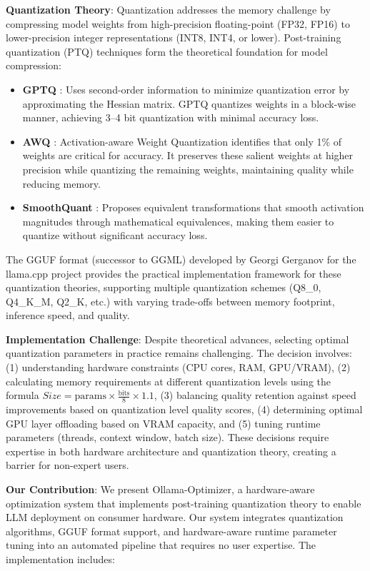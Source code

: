 \documentclass[journal]{IEEEtran}
\begin{document}
\textbf{Quantization Theory}: Quantization addresses the memory challenge by compressing model weights from high-precision floating-point (FP32, FP16) to lower-precision integer representations (INT8, INT4, or lower). Post-training quantization (PTQ) techniques form the theoretical foundation for model compression:

\begin{itemize}
    \item \textbf{GPTQ} \cite{frantar2022}: Uses second-order information to minimize quantization error by approximating the Hessian matrix. GPTQ quantizes weights in a block-wise manner, achieving 3--4 bit quantization with minimal accuracy loss.
    \item \textbf{AWQ} \cite{lin2023}: Activation-aware Weight Quantization identifies that only 1\% of weights are critical for accuracy. It preserves these salient weights at higher precision while quantizing the remaining weights, maintaining quality while reducing memory.
    \item \textbf{SmoothQuant} \cite{xiao2022}: Proposes equivalent transformations that smooth activation magnitudes through mathematical equivalences, making them easier to quantize without significant accuracy loss.
\end{itemize}

The GGUF format (successor to GGML) developed by Georgi Gerganov for the llama.cpp project \cite{gerganov2023} provides the practical implementation framework for these quantization theories, supporting multiple quantization schemes (Q8\_0, Q4\_K\_M, Q2\_K, etc.) with varying trade-offs between memory footprint, inference speed, and quality.

\textbf{Implementation Challenge}: Despite theoretical advances, selecting optimal quantization parameters in practice remains challenging. The decision involves: (1) understanding hardware constraints (CPU cores, RAM, GPU/VRAM), (2) calculating memory requirements at different quantization levels using the formula $Size = \text{params} \times \frac{\text{bits}}{8} \times 1.1$, (3) balancing quality retention against speed improvements based on quantization level quality scores, (4) determining optimal GPU layer offloading based on VRAM capacity, and (5) tuning runtime parameters (threads, context window, batch size). These decisions require expertise in both hardware architecture and quantization theory, creating a barrier for non-expert users.

\textbf{Our Contribution}: We present Ollama-Optimizer, a hardware-aware optimization system that implements post-training quantization theory to enable LLM deployment on consumer hardware. Our system integrates quantization algorithms, GGUF format support, and hardware-aware runtime parameter tuning into an automated pipeline that requires no user expertise. The implementation includes:
\end{document}
